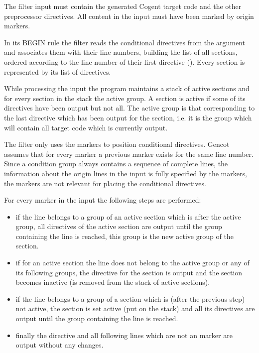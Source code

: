 The filter input must contain the generated Cogent target code and the other preprocessor directives. 
All content in the input must have been marked by origin markers. 

In its BEGIN rule the filter reads the
conditional directives from the argument  and associates them with their line numbers, building the
list of all sections, ordered according to the line number of their first directive ().
Every section is represented by its list of directives.

While processing the input the program maintains a stack of active sections and for every section in the stack the 
active group. A section is active if some of its directives have been output but not all. The active group is that
corresponding to the last directive which has been output for the section, i.e. it is the group which will contain
all target code which is currently output.

The filter only uses the  markers to position conditional directives. Gencot assumes that for every 
 marker a previous  marker exists for the same line number. Since a condition group
always contains a sequence of complete lines, the information about the origin lines in the input is fully specified
by the  markers, the  markers are not relevant for placing the conditional directives.

For every  marker in the input the following steps are performed:
\begin{itemize}
\item if the line belongs to a group of an active section which is after the active group, all directives of the active
section are output until the group containing the line is reached, this group is the new active group of the section.
\item if for an active section the line does not belong to the active group or any of its following groups, 
the  directive for the 
section is output and the section becomes inactive (is removed from the stack of active sections).
\item if the line belongs to a group of a section which is (after the previous step) not active, the section is set 
active (put on the stack) and all its directives are output until the group containing the line is reached.
\item finally the  directive and all following lines which are not an  marker
are output without any changes.
\end{itemize}

